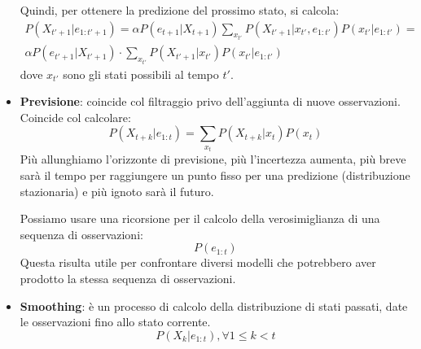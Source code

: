 \begin{itemize}
          Quindi, per ottenere la predizione del prossimo stato, si calcola:
          \begin{equation*}
              \begin{array}{l}
                  P(X_{t'+1} | e_{1:t' + 1}) = \alpha P(e_{t + 1} | X_{t + 1})
                  \sum_{x_{t'}}P(X_{t'+1}|x_{t'},e_{1:t'}) P(x_{t'}|e_{1:t'}) = \\
                  \alpha P(e_{t'+1}|X_{t'+1})\cdot \sum_{x_{t'}}P(X_{t'+1}|x_{t'}) P(x_{t'}|e_{1:t'})
              \end{array}
          \end{equation*}
          dove $x_{t'}$ sono gli stati possibili al tempo $t'$.
    \item \textbf{Previsione}: coincide col filtraggio privo dell'aggiunta di nuove
          osservazioni. Coincide col calcolare:
          \begin{equation*}
              P(X_{t+k } | e_{1:t}) = \sum_{x_t} P(X_{t+k}|x_t) P(x_t)
          \end{equation*}
          Più allunghiamo l'orizzonte di previsione, più l'incertezza aumenta,
          più breve sarà il tempo per raggiungere un punto fisso per una predizione
          (distribuzione stazionaria) e più ignoto sarà il futuro.

          Possiamo usare una ricorsione per il calcolo della verosimiglianza di
          una sequenza di osservazioni:
          \begin{equation*}
              P(e_{1:t})
          \end{equation*}
          Questa risulta utile per confrontare diversi modelli che potrebbero
          aver prodotto la stessa sequenza di osservazioni.
    \item \textbf{Smoothing}: è un processo di calcolo della distribuzione di
          stati passati, date le osservazioni fino allo stato corrente.
          \begin{equation}
              P(X_k | e_{1:t}), \forall 1 \leq k < t
          \end{equation}


\end{itemize}

